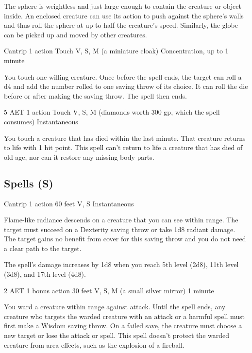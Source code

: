 The sphere is weightless and just large enough to contain the creature or object inside. An enclosed creature can use its action to push against the sphere's walls and thus roll the sphere at up to half the creature's speed. Similarly, the globe can be picked up and moved by other creatures.


{Cantrip}
{1 action}
{Touch}
{V, S, M (a miniature cloak)}
{Concentration, up to 1 minute}

You touch one willing creature. Once before the spell ends, the target can roll a d4 and add the number rolled to one saving throw of its choice. It can roll the die before or after making the saving throw. The spell then ends.


{5 AET}
{1 action}
{Touch}
{V, S, M (diamonds worth 300 gp, which the spell consumes)}
{Instantaneous}

You touch a creature that has died within the last minute. That creature returns to life with 1 hit point. This spell can't return to life a creature that has died of old age, nor can it restore any missing body parts.

\subsection{Spells (S)}


{Cantrip}
{1 action}
{60 feet}
{V, S}
{Instantaneous}

Flame-like radiance descends on a creature that you can see within range. The target must succeed on a Dexterity saving throw or take 1d8 radiant damage. The target gains no benefit from cover for this saving throw and you do not need a clear path to the target.

The spell's damage increases by 1d8 when you reach 5th level (2d8), 11th level (3d8), and 17th level (4d8).


{2 AET}
{1 bonus action}
{30 feet}
{V, S, M (a small silver mirror)}
{1 minute}

You ward a creature within range against attack. Until the spell ends, any creature who targets the warded creature with an attack or a harmful spell must first make a Wisdom saving throw. On a failed save, the creature must choose a new target or lose the attack or spell. This spell doesn't protect the warded creature from area effects, such as the explosion of a fireball.

